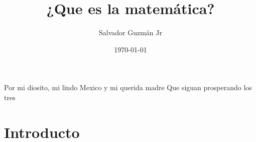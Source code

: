 \documentclass{article}
\begin{document}
	\title{\Large{\textbf{¿Que es la matemática?}}}
	
	\author{Salvador Guzm\'{a}n Jr}
	\date{\today}
	\maketitle
	
	\pagebreak
	\begin{center}
		\thispagestyle{empty}
		\vspace*{\fill}
		Por mi diosito, mi lindo Mexico y mi querida madre
		\linebreak
		Que siguan prosperando los tres
		\vspace*{\fill}
	\end{center}
	\pagebreak
	\tableofcontents
	\pagebreak
	
	\section{Introducto}
\end{document}
